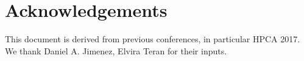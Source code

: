 \documentclass{sig-alternate}
\begin{document}





\section{Acknowledgements}
This document is derived from previous conferences, in particular HPCA 2017.  We thank Daniel A. Jimenez,  Elvira Teran for their inputs.



\end{document}
